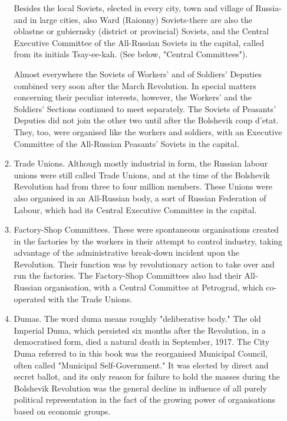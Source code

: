 \begin{enumerate}
\begin{enumerate}
Besides the local Soviets, elected in every city, town and village of Russia-and in large cities, also Ward (Raionny) Soviets-there are also the oblastne or gubiernsky (district or provincial) Soviets, and the Central Executive Committee of the All-Russian Soviets in the capital, called from its initials Tsay-ee-kah. (See below, "Central Committees").

Almost everywhere the Soviets of Workers' and of Soldiers' Deputies combined very soon after the March Revolution. In special matters concerning their peculiar interests, however, the Workers' and the Soldiers' Sections continued to meet separately. The Soviets of Peasants' Deputies did not join the other two until after the Bolshevik coup d'etat. They, too, were organised like the workers and soldiers, with an Executive Committee of the All-Russian Peasants' Soviets in the capital.

\item Trade Unions. Although mostly industrial in form, the Russian labour unions were still called Trade Unions, and at the time of the Bolshevik Revolution had from three to four million members. These Unions were also organised in an All-Russian body, a sort of Russian Federation of Labour, which had its Central Executive Committee in the capital.

\item Factory-Shop Committees. These were spontaneous organisations created in the factories by the workers in their attempt to control industry, taking advantage of the administrative break-down incident upon the Revolution. Their function was by revolutionary action to take over and run the factories. The Factory-Shop Committees also had their All-Russian organisation, with a Central Committee at Petrograd, which co-operated with the Trade Unions.

\item Dumas. The word duma means roughly "deliberative body." The old Imperial Duma, which persisted six months after the Revolution, in a democratised form, died a natural death in September, 1917. The City Duma referred to in this book was the reorganised Municipal Council, often called "Municipal Self-Government." It was elected by direct and secret ballot, and its only reason for failure to hold the masses during the Bolshevik Revolution was the general decline in influence of all purely political representation in the fact of the growing power of organisations based on economic groups.


\end{enumerate}
\end{enumerate}
